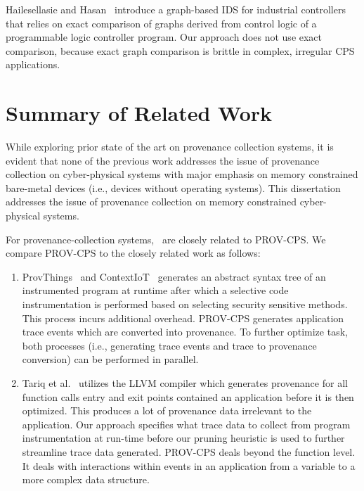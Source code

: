 Hailesellasie and Hasan~\cite{hailesellasie_intrusion_2018} introduce a graph-based IDS for industrial controllers that relies on exact comparison of graphs derived from control logic of a programmable logic controller program. Our approach does not use exact comparison, because exact graph comparison is brittle in complex, irregular CPS applications.



\section{Summary of Related Work}

While exploring prior state of the art on provenance collection systems, it is evident that none of the previous work addresses the issue of provenance collection on cyber-physical systems with major emphasis on memory constrained bare-metal devices (i.e., devices without operating systems). This dissertation addresses the issue of provenance collection on memory constrained cyber-physical systems.

For provenance-collection systems,~\cite{jia2017contexiot, Wang2017FearAL, tariq_towards_2012} are closely related to PROV-CPS. We compare PROV-CPS to the closely related work as follows:

\begin{enumerate}

\item ProvThings~\cite{Wang2017FearAL} and ContextIoT~\cite{jia2017contexiot} generates an abstract syntax tree of an instrumented program at runtime after which a selective code instrumentation is performed based on selecting security sensitive methods. This process incurs additional overhead. PROV-CPS generates application trace events which are converted into provenance. To further optimize task, both processes (i.e., generating trace events and trace to provenance conversion) can be performed in parallel.

\item Tariq et al.~\cite{tariq_towards_2012} utilizes the LLVM compiler which generates provenance for all function calls entry and exit points contained an application before it is then optimized. This produces a lot of provenance data  irrelevant to the application. Our approach specifies what trace data to collect from program instrumentation at run-time before our pruning heuristic is used to further streamline trace data generated. PROV-CPS deals beyond the function level. It deals with interactions within events in an application from a variable to a more complex data structure.

\end{enumerate}


